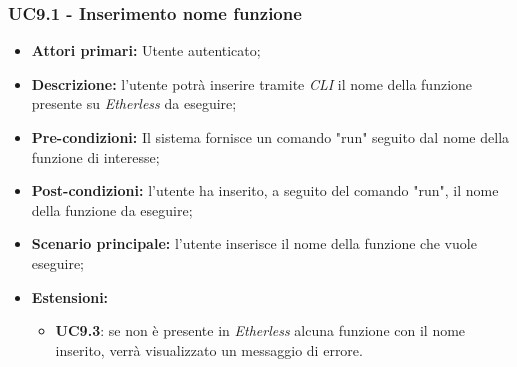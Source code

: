 \subsubsection{UC9.1 - Inserimento nome funzione}
\begin{itemize}
	\item \textbf{Attori primari:} Utente autenticato;
	\item \textbf{Descrizione:} l'utente potrà inserire tramite \textit{CLI} il nome della funzione presente su \textit{Etherless} da eseguire; 
	\item \textbf{Pre-condizioni:} Il sistema fornisce un comando "run" seguito dal nome della funzione di interesse;
	\item \textbf{Post-condizioni:} l'utente ha inserito, a seguito del comando "run", il nome della funzione da eseguire;
	\item \textbf{Scenario principale:} l'utente inserisce il nome della funzione che vuole eseguire;
	\item \textbf{Estensioni:} 
	\begin{itemize}
		\item \textbf{UC9.3}: se non è presente in \textit{Etherless} alcuna funzione con il nome inserito, verrà visualizzato un messaggio di errore.
	\end{itemize}
\end{itemize}